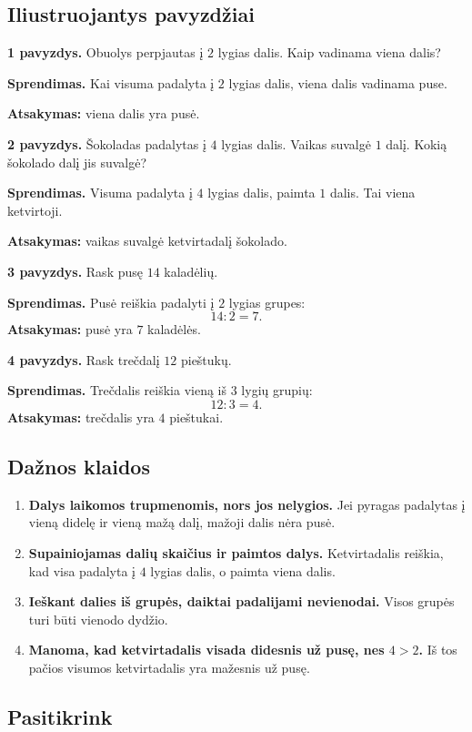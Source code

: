 \subsection{Iliustruojantys pavyzdžiai}

\textbf{1 pavyzdys.} Obuolys perpjautas į \(2\) lygias dalis. Kaip vadinama viena dalis?

\textbf{Sprendimas.} Kai visuma padalyta į \(2\) lygias dalis, viena dalis vadinama puse.

\textbf{Atsakymas:} viena dalis yra pusė.

\textbf{2 pavyzdys.} Šokoladas padalytas į \(4\) lygias dalis. Vaikas suvalgė \(1\) dalį. Kokią šokolado dalį jis suvalgė?

\textbf{Sprendimas.} Visuma padalyta į \(4\) lygias dalis, paimta \(1\) dalis. Tai viena ketvirtoji.

\textbf{Atsakymas:} vaikas suvalgė ketvirtadalį šokolado.

\textbf{3 pavyzdys.} Rask pusę \(14\) kaladėlių.

\textbf{Sprendimas.} Pusė reiškia padalyti į \(2\) lygias grupes:
\[
14:2=7.
\]
\textbf{Atsakymas:} pusė yra \(7\) kaladėlės.

\textbf{4 pavyzdys.} Rask trečdalį \(12\) pieštukų.

\textbf{Sprendimas.} Trečdalis reiškia vieną iš \(3\) lygių grupių:
\[
12:3=4.
\]
\textbf{Atsakymas:} trečdalis yra \(4\) pieštukai.

\subsection{Dažnos klaidos}

\begin{enumerate}
\item \textbf{Dalys laikomos trupmenomis, nors jos nelygios.} Jei pyragas padalytas į vieną didelę ir vieną mažą dalį, mažoji dalis nėra pusė.
\item \textbf{Supainiojamas dalių skaičius ir paimtos dalys.} Ketvirtadalis reiškia, kad visa padalyta į \(4\) lygias dalis, o paimta viena dalis.
\item \textbf{Ieškant dalies iš grupės, daiktai padalijami nevienodai.} Visos grupės turi būti vienodo dydžio.
\item \textbf{Manoma, kad ketvirtadalis visada didesnis už pusę, nes \(4>2\).} Iš tos pačios visumos ketvirtadalis yra mažesnis už pusę.
\end{enumerate}

\subsection{Pasitikrink}

